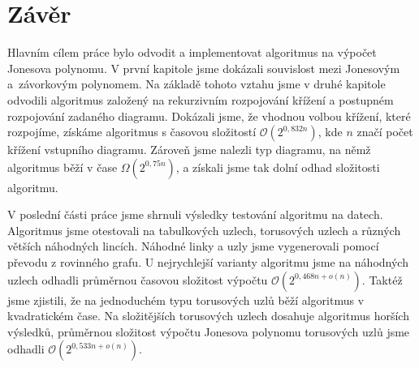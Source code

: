 \chapter*{Závěr}

Hlavním cílem práce bylo odvodit a implementovat algoritmus na výpočet Jonesova polynomu. V první kapitole jsme dokázali souvislost mezi Jonesovým a~závorkovým polynomem.  Na základě tohoto vztahu jsme v druhé kapitole odvodili algoritmus založený na rekurzivním rozpojování křížení a postupném rozpojování zadaného diagramu. Dokázali jsme, že vhodnou volbou křížení, které rozpojíme, získáme algoritmus s časovou složitostí $\mathcal{O}\left(2^{0,832n}\right) $, kde $n$ značí počet křížení vstupního diagramu. Zároveň jsme nalezli typ diagramu, na němž algoritmus běží v čase $\Omega \left(2^{0,75n}\right) $, a získali jsme tak dolní odhad složitosti algoritmu.

V poslední části práce jsme shrnuli výsledky testování algoritmu na datech. Algoritmus jsme otestovali na tabulkových uzlech, torusových uzlech a různých větších náhodných lincích. Náhodné linky a uzly jsme vygenerovali pomocí převodu z rovinného grafu. U nejrychlejší varianty algoritmu  jsme na náhodných uzlech odhadli průměrnou časovou složitost výpočtu $\mathcal{O}\left(2^{0,468n+ o(n)}\right) $. Taktéž jsme zjistili, že na jednoduchém typu torusových uzlů běží algoritmus v kvadratickém čase. Na složitějších torusových uzlech dosahuje algoritmus horších výsledků, průměrnou složitost výpočtu Jonesova polynomu torusových uzlů jsme odhadli $\mathcal{O}\left(2^{0,533n+ o(n)}\right) $.
